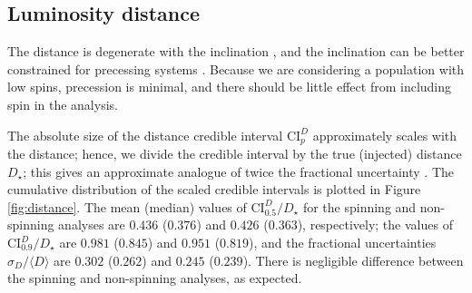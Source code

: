 \subsection{Luminosity distance}\label{sec:distance}

The distance is degenerate with the inclination \citep{Cutler_1994,Aasi_2013}, and the inclination can be better constrained for precessing systems \citep{van_der_Sluys_2008,Vitale_2014}. Because we are considering a population with low spins, precession is minimal, and there should be little effect from including spin in the analysis.

The absolute size of the distance credible interval $\mathrm{CI}_p^{D}$ approximately scales with the distance; hence, we divide the credible interval by the true (injected) distance $D_\star$; this gives an approximate analogue of twice the fractional uncertainty \citep{Berry_2014}. The cumulative distribution of the scaled credible intervals is plotted in Figure \ref{fig:distance}. The mean (median) values of $\mathrm{CI}_{0.5}^{D}/D_\star$ for the spinning and non-spinning analyses are $0.436$ ($0.376$) and $0.426$ ($0.363$), respectively; the values of $\mathrm{CI}_{0.9}^{D}/D_\star$ are $0.981$ ($0.845$) and $0.951$ ($0.819$), and the fractional uncertainties $\sigma_D/\langle D\rangle$ are $0.302$ ($0.262$) and $0.245$ ($0.239$). There is negligible difference between the spinning and non-spinning analyses, as expected.


  
  
  
  
  
  